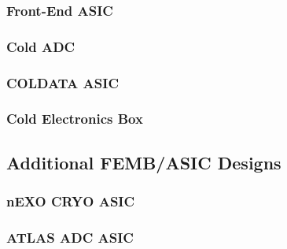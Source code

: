 \subsubsection{Front-End ASIC}
\label{sec:fdsp-tpc-elec-design-femb-fe}


\subsubsection{Cold ADC}
\label{sec:fdsp-tpc-elec-design-femb-adc}


\subsubsection{COLDATA ASIC}
\label{sec:fdsp-tpc-elec-design-femb-coldata}


\subsubsection{Cold Electronics Box}
\label{sec:fdsp-tpc-elec-design-femb-box}


\subsection{Additional FEMB/ASIC Designs}
\label{sec:fdsp-tpc-elec-design-alt}


\subsubsection{nEXO CRYO ASIC}
\label{sec:fdsp-tpc-elec-design-alt-cryo}


\subsubsection{ATLAS ADC ASIC}
\label{sec:fdsp-tpc-elec-design-alt-atlas}


